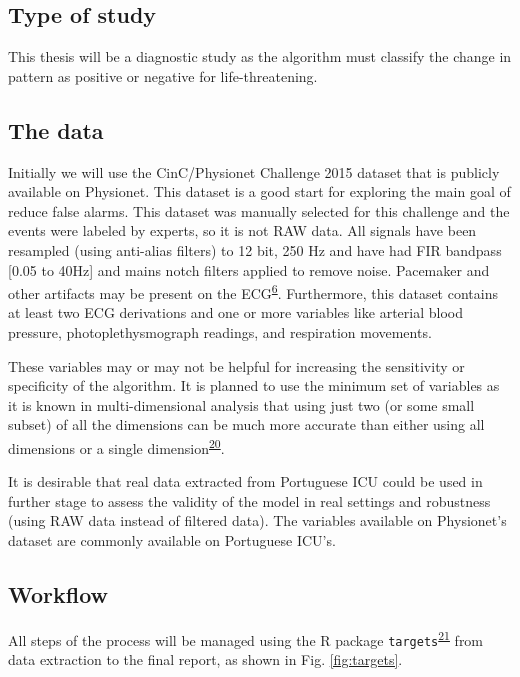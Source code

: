 \documentclass[12pt,twoside]{reedthesis}
\begin{document}
\hypertarget{type-of-study}{%
\subsection{Type of study}\label{type-of-study}}

This thesis will be a diagnostic study as the algorithm must classify the change in pattern as positive or negative for
life-threatening.

\hypertarget{the-data}{%
\subsection{The data}\label{the-data}}

Initially we will use the CinC/Physionet Challenge 2015 dataset that is publicly available on Physionet. This dataset is
a good start for exploring the main goal of reduce false alarms. This dataset was manually selected for this challenge
and the events were labeled by experts, so it is not RAW data. All signals have been resampled (using anti-alias
filters) to 12 bit, 250 Hz and have had FIR bandpass {[}0.05 to 40Hz{]} and mains notch filters applied to remove noise.
Pacemaker and other artifacts may be present on the ECG\textsuperscript{\protect\hyperlink{ref-Clifford2015}{6}}. Furthermore, this dataset contains at least two
ECG derivations and one or more variables like arterial blood pressure, photoplethysmograph readings, and respiration
movements.

These variables may or may not be helpful for increasing the sensitivity or specificity of the algorithm. It is planned
to use the minimum set of variables as it is known in multi-dimensional analysis that using just two (or some small
subset) of all the dimensions can be much more accurate than either using all dimensions or a single
dimension\textsuperscript{\protect\hyperlink{ref-gharghabi2018}{20}}.

It is desirable that real data extracted from Portuguese ICU could be used in further stage to assess the validity of
the model in real settings and robustness (using RAW data instead of filtered data). The variables available on
Physionet's dataset are commonly available on Portuguese ICU's.

\hypertarget{workflow}{%
\subsection{Workflow}\label{workflow}}

All steps of the process will be managed using the R package \texttt{targets}\textsuperscript{\protect\hyperlink{ref-landau2021}{21}} from data extraction to the final
report, as shown in Fig. \ref{fig:targets}.
\end{document}
